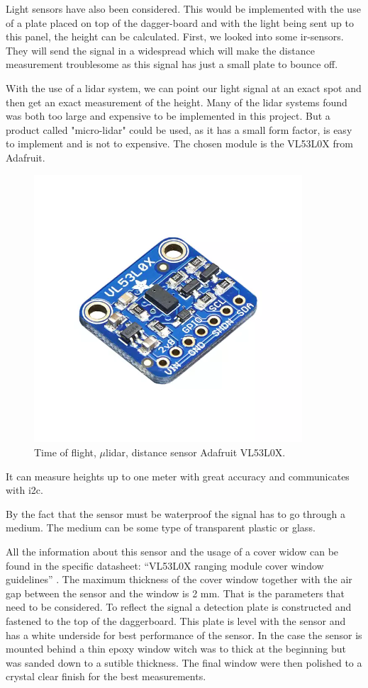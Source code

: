 Light sensors have also been considered. This would be implemented with the use of a plate placed on top of the dagger-board and with the light being sent up to this panel, the height can be calculated. First, we looked into some \gls{ir}-sensors. They will send the signal in a widespread which will make the distance measurement troublesome as this signal has just a small plate to bounce off.

With the use of a \gls{lidar} system, we can point our light signal at an exact spot and then get an exact measurement of the height.  
Many of the \gls{lidar} systems found was both too large and expensive to be implemented in this project.
But a product called "micro-lidar" could be used, as it has a small form factor, is easy to implement and is not to expensive.
The chosen module is the VL53L0X from Adafruit\cite{micro_lidar}. 

\begin{figure}[H]
	\centering
	\includegraphics[width = 10cm]{Figures/Adafruit_height_sensor.png}
	\caption{Time of flight, $\mu$\gls{lidar}, distance sensor Adafruit VL53L0X.}
	\label{micro_lidar}
\end{figure}

It can measure heights up to one meter with great accuracy and communicates with \gls{i2c}.

By the fact that the sensor must be waterproof the signal has to go through a medium. The medium can be some type of transparent plastic or glass.   

All the information about this sensor and the usage of a cover widow can be found in the specific datasheet: “VL53L0X ranging module cover window guidelines” \cite{Tof_cover}. The maximum thickness of the cover window together with the air gap between the sensor and the window is 2 mm. That is the parameters that need to be considered. To reflect the signal a detection plate is constructed and fastened to the top of the daggerboard. This plate is level with the sensor and has a white underside for best performance of the sensor. In the case the sensor is mounted behind a thin epoxy window witch was to thick at the beginning but was sanded down to a sutible thickness. The final window were then polished to a crystal clear finish for the best measurements. 

